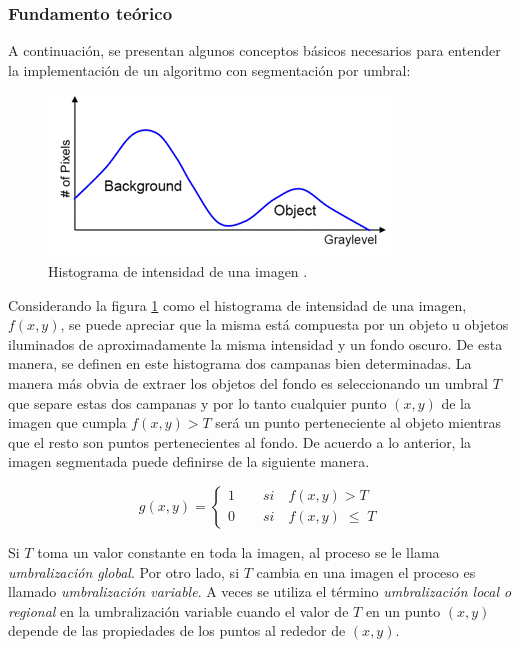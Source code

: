 \subsubsection{Fundamento teórico }
\label{fundamentoteoseg}

A continuación, se presentan algunos conceptos básicos necesarios para entender la implementación de un algoritmo con segmentación por umbral:

\begin{figure}[hbt]
\begin{center}
\includegraphics[scale=0.7]{img/otsu2.png}
\end{center}
\caption{Histograma de intensidad de una imagen \footnotemark.}
\label{otsuFruta}
\end{figure}


Considerando la figura \ref{otsuFruta} como el histograma de intensidad de una imagen, $f(x,y)$, se puede apreciar que la misma está compuesta por un objeto u objetos iluminados de aproximadamente la misma intensidad y un fondo oscuro. De esta manera, se definen en este histograma dos campanas bien determinadas. La manera más obvia de extraer los objetos del fondo es seleccionando un umbral $T$ que separe estas dos campanas y por lo tanto cualquier punto $(x,y)$ de la imagen que cumpla $f(x,y) > T$ será un punto perteneciente al objeto mientras que el resto son puntos pertenecientes al fondo. De acuerdo a lo anterior, la imagen segmentada puede definirse de la siguiente manera.

\begin{equation}
g(x,y) = \left\{
\begin{array}{l}
\displaystyle 1{\qquad}si{\quad}f(x,y) > T\\
\displaystyle 0{\qquad}si{\quad}f(x,y)\;{\leq}\;T
\end{array} 
\right.
\label{eq:xdef}
\end{equation}

Si $T$ toma un valor constante en toda la imagen, al proceso se le llama \textit{umbralización global}. Por otro lado, si $T$ cambia en una imagen el proceso es llamado \textit{umbralización variable}. A veces se utiliza el término \textit{umbralización local o regional} en la umbralización variable cuando el valor de $T$ en un punto $(x,y)$ depende de las propiedades de los puntos al rededor de $(x,y)$.

